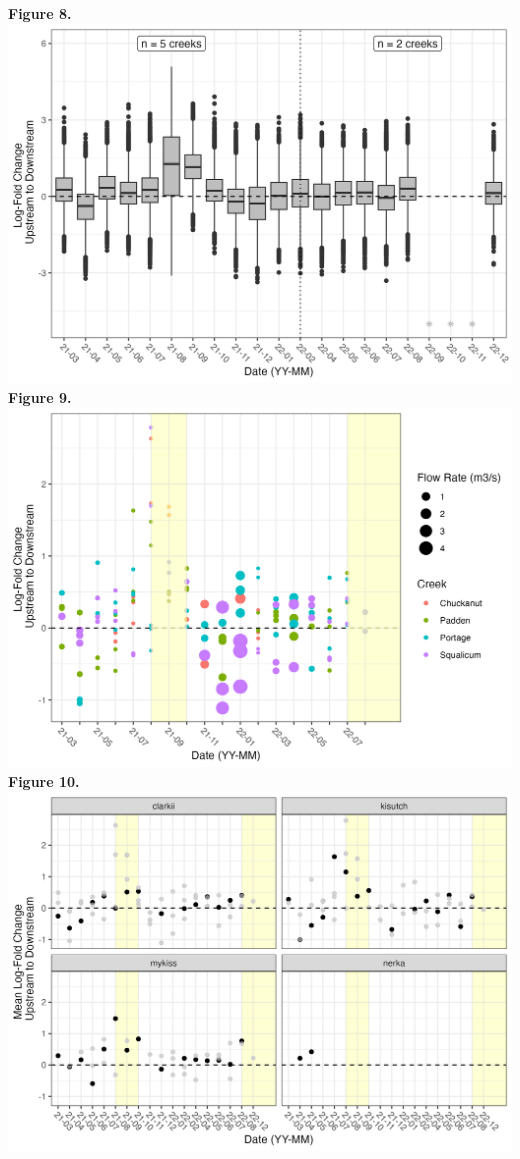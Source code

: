 \documentclass[
]{article}
\begin{document}
\newpage \textbf{Figure 8.}
\includegraphics{../Output/Figures/culvert_boxplot_passable.png}
\newpage \textbf{Figure 9.}
\includegraphics{../Output/Figures/culvert_means_flow.png} \newpage
\textbf{Figure 10.}
\includegraphics{../Output/Figures/culvert_padden_controls.png} \newpage
\end{document}

